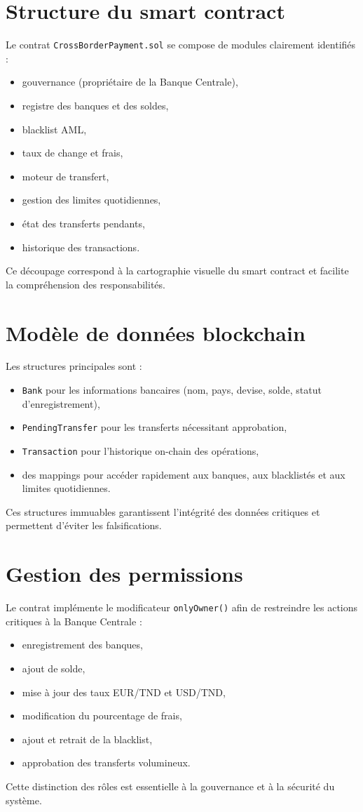 \documentclass[a4paper,12pt]{report}
\begin{document}
\section{Structure du smart contract}
Le contrat \texttt{CrossBorderPayment.sol} se compose de modules clairement identifiés :
\begin{itemize}[leftmargin=*,nosep]
  \item gouvernance (propriétaire de la Banque Centrale),
  \item registre des banques et des soldes,
  \item blacklist AML,
  \item taux de change et frais,
  \item moteur de transfert,
  \item gestion des limites quotidiennes,
  \item état des transferts pendants,
  \item historique des transactions.
\end{itemize}
Ce découpage correspond à la cartographie visuelle du smart contract et facilite la compréhension des responsabilités.

\section{Modèle de données blockchain}
Les structures principales sont :
\begin{itemize}[leftmargin=*,nosep]
  \item \texttt{Bank} pour les informations bancaires (nom, pays, devise, solde, statut d'enregistrement),
  \item \texttt{PendingTransfer} pour les transferts nécessitant approbation,
  \item \texttt{Transaction} pour l'historique on-chain des opérations,
  \  
  \item des mappings pour accéder rapidement aux banques, aux blacklistés et aux limites quotidiennes.
\end{itemize}
Ces structures immuables garantissent l'intégrité des données critiques et permettent d'éviter les falsifications.

\section{Gestion des permissions}
Le contrat implémente le modificateur \texttt{onlyOwner()} afin de restreindre les actions critiques à la Banque Centrale :
\begin{itemize}[leftmargin=*,nosep]
  \item enregistrement des banques,
  \item ajout de solde,
  \item mise à jour des taux EUR/TND et USD/TND,
  \item modification du pourcentage de frais,
  \item ajout et retrait de la blacklist,
  \item approbation des transferts volumineux.
\end{itemize}
Cette distinction des rôles est essentielle à la gouvernance et à la sécurité du système.
\end{document}
